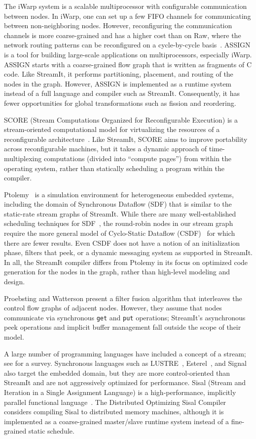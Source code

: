 The iWarp system \cite{iwarp} is a scalable multiprocessor with
configurable communication between nodes.  In iWarp, one can set up a
few FIFO channels for communicating between non-neighboring
nodes. However, reconfiguring the communication channels is more
coarse-grained and has a higher cost than on Raw, where the network
routing patterns can be reconfigured on a cycle-by-cycle
basis~\cite{scalaroperands}.  ASSIGN \cite{assign} is a tool for
building large-scale applications on multiprocessors, especially
iWarp.  ASSIGN starts with a coarse-grained flow graph that is written
as fragments of C code.  Like StreamIt, it performs partitioning,
placement, and routing of the nodes in the graph.  However, ASSIGN is
implemented as a runtime system instead of a full language and
compiler such as StreamIt.  Consequently, it has fewer opportunities
for global transformations such as fission and reordering.

SCORE (Stream Computations Organized for Reconfigurable Execution) is
a stream-oriented computational model for virtualizing the resources
of a reconfigurable architecture~\cite{score}.  Like StreamIt, SCORE
aims to improve portability across reconfigurable machines, but it
takes a dynamic approach of time-multiplexing computations (divided
into ``compute pages'') from within the operating system, rather than
statically scheduling a program within the compiler.

Ptolemy~\cite{ptolemyoverview} is a simulation environment for
heterogeneous embedded systems, including the domain of Synchronous
Dataflow (SDF) that is similar to the static-rate stream graphs of
StreamIt.  While there are many well-established scheduling techniques
for SDF~\cite{leesdf}, the round-robin nodes in our stream graph
require the more general model of Cyclo-Static Dataflow
(CSDF)~\cite{BELP96} for which there are fewer results.  Even CSDF
does not have a notion of an initialization phase, filters that peek,
or a dynamic messaging system as supported in StreamIt.  In all, the
StreamIt compiler differs from Ptolemy in its focus on optimized code
generation for the nodes in the graph, rather than high-level modeling
and design.

Proebsting and Watterson \cite{pro96} present a filter fusion
algorithm that interleaves the control flow graphs of adjacent nodes.
However, they assume that nodes communicate via synchronous {\tt get}
and {\tt put} operations; StreamIt's asynchronous peek operations and
implicit buffer management fall outside the scope of their model.

A large number of programming languages have included a concept of a
stream; see \cite{survey97} for a survey.  Synchronous languages such
as LUSTRE~\cite{lustre}, Esterel~\cite{esterel92}, and
Signal~\cite{signal} also target the embedded domain, but they are
more control-oriented than StreamIt and are not aggressively optimized
for performance.  Sisal (Stream and Iteration in a Single Assignment
Language) is a high-performance, implicitly parallel functional
language~\cite{sisal}.  The Distributed Optimizing Sisal
Compiler~\cite{sisal} considers compiling Sisal to distributed memory
machines, although it is implemented as a coarse-grained master/slave
runtime system instead of a fine-grained static schedule.


